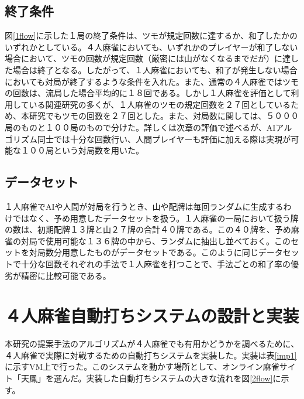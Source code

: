 \subsection{終了条件}
図\ref{1flow}に示した１局の終了条件は、ツモが規定回数に達するか、和了したかのいずれかとしている。４人麻雀においても、いずれかのプレイヤーが和了しない場合において、ツモの回数が規定回数（厳密には山がなくなるまでだが）に達した場合は終了となる。したがって、１人麻雀においても、和了が発生しない場合においても対局が終了するような条件を入れた。また、通常の４人麻雀ではツモの回数は、流局した場合平均的に１８回である。しかし１人麻雀を評価として利用している関連研究の多く\cite{zentsu}\cite{bakuuti2013}が、１人麻雀のツモの規定回数を２７回としているため、本研究でもツモの回数を２７回とした。また、対局数に関しては、５０００局のものと１００局のもので分けた。詳しくは次章の評価で述べるが、AIアルゴリズム同士では十分な回数行い、人間プレイヤーも評価に加える際は実現が可能な１００局という対局数を用いた。

\subsection{データセット}
１人麻雀でAIや人間が対局を行うとき、山や配牌は毎回ランダムに生成するわけではなく、予め用意したデータセットを扱う。１人麻雀の一局において扱う牌の数は、初期配牌１３牌と山２７牌の合計４０牌である。この４０牌を、予め麻雀の対局で使用可能な１３６牌の中から、ランダムに抽出し並べておく。このセットを対局数分用意したものがデータセットである。このように同じデータセットで十分な回数それぞれの手法で１人麻雀を打つことで、手法ごとの和了率の優劣が精密に比較可能である。





\section{４人麻雀自動打ちシステムの設計と実装} %
本研究の提案手法のアルゴリズムが４人麻雀でも有用かどうかを調べるために、４人麻雀で実際に対戦するための自動打ちシステムを実装した。実装は表\ref{imp1}に示すVM上で行った。このシステムを動かす場所として、オンライン麻雀サイト「天鳳」\cite{tenhou}を選んだ。実装した自動打ちシステムの大きな流れを図\ref{2flow}に示す。


